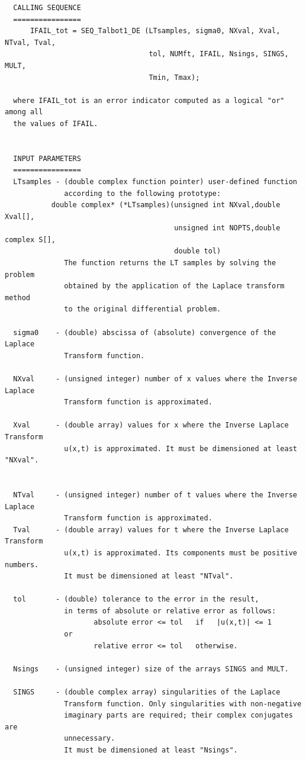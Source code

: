\documentclass[a4paper,10pt]{report}%
\begin{document}
\begin{lstlisting}
  CALLING SEQUENCE
  ================
      IFAIL_tot = SEQ_Talbot1_DE (LTsamples, sigma0, NXval, Xval, NTval, Tval,
                                  tol, NUMft, IFAIL, Nsings, SINGS, MULT,
                                  Tmin, Tmax);

  where IFAIL_tot is an error indicator computed as a logical "or" among all
  the values of IFAIL.


  INPUT PARAMETERS
  ================
  LTsamples - (double complex function pointer) user-defined function
              according to the following prototype:
           double complex* (*LTsamples)(unsigned int NXval,double Xval[],
                                        unsigned int NOPTS,double complex S[],
                                        double tol)
              The function returns the LT samples by solving the problem
              obtained by the application of the Laplace transform method
              to the original differential problem.

  sigma0    - (double) abscissa of (absolute) convergence of the Laplace
              Transform function.

  NXval     - (unsigned integer) number of x values where the Inverse Laplace
              Transform function is approximated.

  Xval      - (double array) values for x where the Inverse Laplace Transform
              u(x,t) is approximated. It must be dimensioned at least "NXval".
             

  NTval     - (unsigned integer) number of t values where the Inverse Laplace
              Transform function is approximated.
  Tval      - (double array) values for t where the Inverse Laplace Transform
              u(x,t) is approximated. Its components must be positive numbers.
              It must be dimensioned at least "NTval".

  tol       - (double) tolerance to the error in the result,
              in terms of absolute or relative error as follows:
                     absolute error <= tol   if   |u(x,t)| <= 1
              or
                     relative error <= tol   otherwise.

  Nsings    - (unsigned integer) size of the arrays SINGS and MULT.

  SINGS     - (double complex array) singularities of the Laplace
              Transform function. Only singularities with non-negative
              imaginary parts are required; their complex conjugates are
              unnecessary.
              It must be dimensioned at least "Nsings".


\end{lstlisting}
\end{document}
